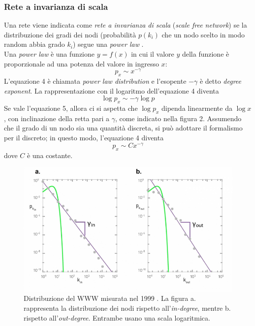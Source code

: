 \documentclass[a4paper,12pt]{article}
\begin{document}
\subsubsection{Rete a invarianza di scala}
Una rete viene indicata come \textit{rete a invarianza di scala} (\textit{scale free network}) se la distribuzione dei gradi dei nodi (probabilità $p(k_i)$ che un nodo scelto in modo random abbia grado $k_i$) segue una \textit{power law} \cite{scalefree}.\\
Una \textit{power law} \cite{barabasi} è una funzione $y=f(x)$ in cui il valore $y$ della funzione è proporzionale ad una potenza del valore in ingresso $x$:
\begin{equation}
p_x \sim x^{-\gamma}
\end{equation}
L'equazione 4 è chiamata \textit{power law distribution} e l'esopente $-\gamma$ è detto \textit{degree exponent}. La rappresentazione con il logaritmo dell'equazione 4 diventa
\begin{equation}
\log p_x \sim -\gamma \log p
\end{equation}
Se vale l'equazione 5, allora ci si aspetta che $\log p_x$ dipenda linearmente da $\log x$, con inclinazione della retta pari a $\gamma$, come indicato nella figura 2. Assumendo che il grado di un nodo sia una quantità discreta, si può adottare il formalismo per il discreto; in questo modo, l'equazione 4 diventa
\begin{equation}
p_x \sim Cx^{-\gamma}
\end{equation} 
dove $C$ è una costante.
\begin{figure}[h]
\centering
\includegraphics[scale=0.5]{images/powerlaw.png}
\caption{Distribuzione del WWW misurata nel 1999 \cite{barabasi}. La figura a. rappresenta la distribuzione dei nodi rispetto all'\textit{in-degree}, mentre b. rispetto all'\textit{out-degree}. Entrambe usano una scala logaritmica.}
\end{figure}
\end{document}
